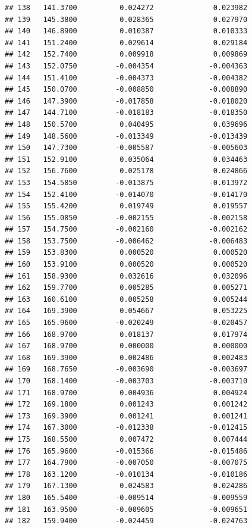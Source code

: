 \documentclass[
]{article}
\begin{document}
\begin{verbatim}
## 138   141.3700          0.024272              0.023982
## 139   145.3800          0.028365              0.027970
## 140   146.8900          0.010387              0.010333
## 141   151.2400          0.029614              0.029184
## 142   152.7400          0.009918              0.009869
## 143   152.0750         -0.004354             -0.004363
## 144   151.4100         -0.004373             -0.004382
## 145   150.0700         -0.008850             -0.008890
## 146   147.3900         -0.017858             -0.018020
## 147   144.7100         -0.018183             -0.018350
## 148   150.5700          0.040495              0.039696
## 149   148.5600         -0.013349             -0.013439
## 150   147.7300         -0.005587             -0.005603
## 151   152.9100          0.035064              0.034463
## 152   156.7600          0.025178              0.024866
## 153   154.5850         -0.013875             -0.013972
## 154   152.4100         -0.014070             -0.014170
## 155   155.4200          0.019749              0.019557
## 156   155.0850         -0.002155             -0.002158
## 157   154.7500         -0.002160             -0.002162
## 158   153.7500         -0.006462             -0.006483
## 159   153.8300          0.000520              0.000520
## 160   153.9100          0.000520              0.000520
## 161   158.9300          0.032616              0.032096
## 162   159.7700          0.005285              0.005271
## 163   160.6100          0.005258              0.005244
## 164   169.3900          0.054667              0.053225
## 165   165.9600         -0.020249             -0.020457
## 166   168.9700          0.018137              0.017974
## 167   168.9700          0.000000              0.000000
## 168   169.3900          0.002486              0.002483
## 169   168.7650         -0.003690             -0.003697
## 170   168.1400         -0.003703             -0.003710
## 171   168.9700          0.004936              0.004924
## 172   169.1800          0.001243              0.001242
## 173   169.3900          0.001241              0.001241
## 174   167.3000         -0.012338             -0.012415
## 175   168.5500          0.007472              0.007444
## 176   165.9600         -0.015366             -0.015486
## 177   164.7900         -0.007050             -0.007075
## 178   163.1200         -0.010134             -0.010186
## 179   167.1300          0.024583              0.024286
## 180   165.5400         -0.009514             -0.009559
## 181   163.9500         -0.009605             -0.009651
## 182   159.9400         -0.024459             -0.024763

\end{verbatim}
\end{document}
